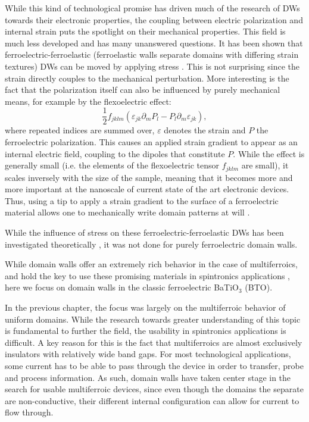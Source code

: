 While this kind of technological promise has driven much of the research of DWs towards their electronic properties, the coupling between electric polarization and internal strain puts the spotlight on their mechanical properties.
This field is much less developed and has many unanswered questions. 
It has been shown that ferroelectric-ferroelastic (ferroelastic walls separate domains with differing strain textures) DWs can be moved by applying stress \cite{Schneider2001}. This is not surprising since the strain directly couples to the mechanical perturbation.
More interesting is the fact that the polarization itself can also be influenced by purely mechanical means, for example by the flexoelectric effect:
\begin{equation}
\frac{1}{2}f_{jklm}(\varepsilon_{jk}\partial_mP_l-P_l\partial_m\varepsilon_{jk}),
\end{equation}
where repeated indices are summed over, $\varepsilon$ denotes the strain and $P$ the ferroelectric polarization. This causes an applied strain gradient to appear as an internal electric field, coupling to the dipoles that constitute $P$.
While the effect is generally small (i.e. the elements of the flexoelectric tensor $f_{jklm}$ are small), it scales inversely with the size of the sample, meaning that it becomes more and more important at the nanoscale of current state of the art electronic devices.
Thus, using a tip to apply a strain gradient to the surface of a ferroelectric material allows one to mechanically write domain patterns at will \cite{Lu2012}.

While the influence of stress on these ferroelectric-ferroelastic DWs has been investigated theoretically \cite{Lee2003}, it was not done for purely ferroelectric domain walls.

While domain walls offer an extremely rich behavior in the case of multiferroics, and hold the key to use these promising materials in spintronics applications \cite{Lee2014}, here we focus on domain walls in the classic ferroelectric BaTiO$_3$ (BTO).   



In the previous chapter, the focus was largely on the multiferroic behavior of uniform domains. While the research towards greater understanding of this topic is fundamental to further the field, the usability in spintronics applications is difficult.
A key reason for this is the fact that multiferroics are almost exclusively insulators with relatively wide band gaps.
For most technological applications, some current has to be able to pass through the device in order to transfer, probe and process information.
As such, domain walls have taken center stage in the search for usable multiferroic devices, since even though the domains the separate are non-conductive, their different internal configuration can allow for current to flow through.



